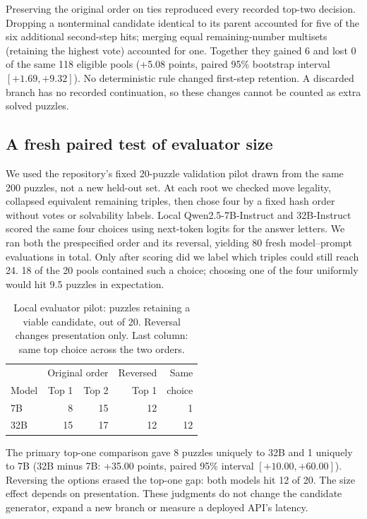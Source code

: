 Preserving the original order on ties reproduced every recorded top-two decision. Dropping a nonterminal candidate identical to its parent accounted for five of the six additional second-step hits; merging equal remaining-number multisets (retaining the highest vote) accounted for one. Together they gained 6 and lost 0 of the same 118 eligible pools (+5.08 points, paired 95\% bootstrap interval $[+1.69, +9.32]$). No deterministic rule changed first-step retention. A discarded branch has no recorded continuation, so these changes cannot be counted as extra solved puzzles.

\subsection{A fresh paired test of evaluator size}
We used the repository's fixed 20-puzzle validation pilot drawn from the same 200 puzzles, not a new held-out set. At each root we checked move legality, collapsed equivalent remaining triples, then chose four by a fixed hash order without votes or solvability labels. Local Qwen2.5-7B-Instruct and 32B-Instruct scored the same four choices using next-token logits for the answer letters. We ran both the prespecified order and its reversal, yielding 80 fresh model--prompt evaluations in total. Only after scoring did we label which triples could still reach 24. 18 of the 20 pools contained such a choice; choosing one of the four uniformly would hit 9.5 puzzles in expectation.

\begin{table}[tb]
\centering\small
\caption{Local evaluator pilot: puzzles retaining a viable candidate, out of 20. Reversal changes presentation only. Last column: same top choice across the two orders.}
\label{tab:jt-judges}
\setlength{\tabcolsep}{4.5pt}
\begin{tabular}{@{}lrrrr@{}}\toprule
& \multicolumn{2}{c}{Original order} & Reversed & Same \\
Model & Top 1 & Top 2 & Top 1 & choice \\ \midrule
7B & 8 & 15 & 12 & 1 \\
32B & 15 & 17 & 12 & 12 \\
\bottomrule\end{tabular}
\end{table}

The primary top-one comparison gave 8 puzzles uniquely to 32B and 1 uniquely to 7B (32B minus 7B: +35.00 points, paired 95\% interval $[+10.00, +60.00]$). Reversing the options erased the top-one gap: both models hit 12 of 20. The size effect depends on presentation. These judgments do not change the candidate generator, expand a new branch or measure a deployed API's latency.

